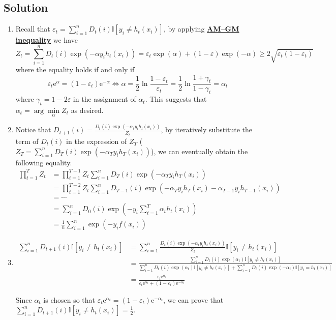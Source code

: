 \documentclass[8pt]{article}
\theoremstyle{compact}
\def\obj#1{\textbf{\uline{#1}}}
\def\ge{\geqslant}
\def\e{\mathrm{e}}
\begin{document}
\subsection*{Solution}
\begin{enumerate}
	\item Recall that $\varepsilon_t = \sum\limits_{i=1}^{n}D_t(i)\mathbb I[y_i \neq h_t(x_i)]$, by applying \obj{AM–GM inequality} we have
	$$Z_t = \sum\limits_{i=1}^{n}D_t(i)\exp(-\alpha y_i h_t(x_i)) = \varepsilon_t \exp(\alpha) + (1 - \varepsilon)\exp(-\alpha) \ge 2\sqrt{\varepsilon_t(1 - \varepsilon_t)}$$
	where the equality holds if and only if $$\varepsilon_t \e^{\alpha} = (1 - \varepsilon_t)\e^{-\alpha} \Leftrightarrow \alpha = \frac12 \ln\frac{1 - \varepsilon_t}{\varepsilon_t} = \frac12 \ln\frac{1 + \gamma_t}{1 - \gamma_t} = \alpha_t$$
	where $\gamma_t = 1 - 2\varepsilon$ in the assignment of $\alpha_t$. This suggests that $\alpha_t = \arg\min\limits_{\alpha} Z_t$ as desired.

	\item Notice that $D_{t+1}(i) = \frac{D_t(i)\exp(-\alpha_t y_i h_t(x_i))}{Z_t}$, by iteratively substitute the term of $D_t(i)$ in the expression of $Z_T$ ($Z_T = \sum_{i=1}^{n}D_T(i)\exp(-\alpha_T y_i h_T(x_i))$), we can eventually obtain the following equality. \begin{equation*}
		\begin{split}
			\prod_{t=1}^{T}Z_t &= \prod_{t=1}^{T-1}Z_t \sum_{i=1}^{n}D_T(i)\exp(-\alpha_T y_i h_T(x_i))\\
			&= \prod_{t=1}^{T-2}Z_t \sum_{i=1}^{n}D_{T-1}(i)\exp(-\alpha_T y_i h_T(x_i) -\alpha_{T-1} y_i h_{T-1}(x_i))\\
			&= \cdots\\
			&= \sum\limits_{i=1}^{n}D_0(i)\exp\left(-y_i\sum\limits_{t=1}^{T}\alpha_t h_t(x_i)\right)\\
			&= \frac1n \sum\limits_{i=1}^{n}\exp\left(-y_if(x_i)\right)
		\end{split}
	\end{equation*}
	
	\item \begin{equation*}
		\begin{split}
			\sum_{i=1}^{n}D_{t+1}(i)\mathbb I[y_i \neq h_t(x_i)] &= \sum_{i=1}^{n}\frac{D_{t}(i)\exp(-\alpha_t y_i h_t(x_i))}{Z_t}\mathbb I[y_i \neq h_t(x_i)]\\
			&= \frac{\sum\limits_{i=1}^{n}D_{t}(i)\exp(\alpha_t)\mathbb I[y_i \neq h_t(x_i)]}{\sum\limits_{i=1}^{n}D_{t}(i)\exp(\alpha_t)\mathbb I[y_i \neq h_t(x_i)] + \sum\limits_{i=1}^{n}D_{t}(i)\exp(-\alpha_t)\mathbb I[y_i = h_t(x_i)]}\\
			&= \frac{\varepsilon_t \e^{\alpha_t}}{\varepsilon_t \e^{\alpha_t} + (1 - \varepsilon_t)\e^{-\alpha_t}}
		\end{split}
	\end{equation*}

	Since $\alpha_t$ is chosen so that $\varepsilon_t \e^{\alpha_t} = (1 - \varepsilon_t)\e^{-\alpha_t}$, we can prove that $\sum\limits_{i=1}^{n}D_{t+1}(i)\mathbb I[y_i \neq h_t(x_i)] = \frac12$.
\end{enumerate}
\end{document}
